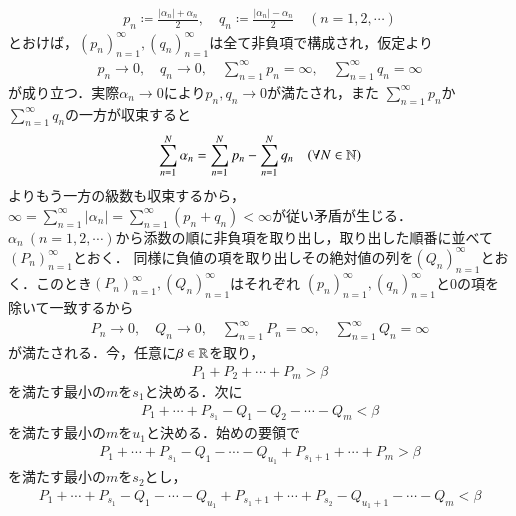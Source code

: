 	\begin{prf}
		\begin{align}
			p_n \coloneqq \frac{|\alpha_n| + \alpha_n}{2},
			\quad q_n \coloneqq \frac{|\alpha_n| - \alpha_n}{2}
			\quad (n=1,2,\cdots)
		\end{align}
		とおけば，$(p_n)_{n=1}^{\infty},(q_n)_{n=1}^{\infty}$は全て非負項で構成され，仮定より
		\begin{align}
			p_n \longrightarrow 0,
			\quad q_n \longrightarrow 0,
			\quad \sum_{n=1}^{\infty} p_n = \infty,
			\quad \sum_{n=1}^{\infty} q_n = \infty
		\end{align}
		が成り立つ．実際$\alpha_n \longrightarrow 0$により$p_n,q_n \longrightarrow 0$が満たされ，また
		$\sum_{n=1}^{\infty} p_n$か$\sum_{n=1}^{\infty} q_n$の一方が収束すると
		\begin{align}
			\sum_{n=1}^N \alpha_n = \sum_{n=1}^N p_n - \sum_{n=1}^N q_n
			\quad (\forall N \in \mathbb{N})
		\end{align}
		よりもう一方の級数も収束するから，
		$\infty = \sum_{n=1}^{\infty} |\alpha_n| = \sum_{n=1}^{\infty} (p_n + q_n) < \infty$が従い矛盾が生じる．
		$\alpha_n\ (n=1,2,\cdots)$から添数の順に非負項を取り出し，取り出した順番に並べて$(P_n)_{n=1}^{\infty}$とおく．
		同様に負値の項を取り出しその絶対値の列を$(Q_n)_{n=1}^{\infty}$とおく．このとき$(P_n)_{n=1}^{\infty},(Q_n)_{n=1}^{\infty}$はそれぞれ
		$(p_n)_{n=1}^{\infty},(q_n)_{n=1}^{\infty}$と0の項を除いて一致するから
		\begin{align}
			P_n \longrightarrow 0,
			\quad Q_n \longrightarrow 0,
			\quad \sum_{n=1}^{\infty} P_n = \infty,
			\quad \sum_{n=1}^{\infty} Q_n = \infty
			\label{eq:thm_riemann_series_1}
		\end{align}
		が満たされる．今，任意に$\beta \in \mathbb{R}$を取り，
		\begin{align}
			P_1 + P_2 + \cdots + P_m > \beta
		\end{align}
		を満たす最小の$m$を$s_1$と決める．次に
		\begin{align}
			P_1 + \cdots + P_{s_1} - Q_1 - Q_2 - \cdots - Q_m < \beta
		\end{align}
		を満たす最小の$m$を$u_1$と決める．始めの要領で
		\begin{align}
			P_1 + \cdots + P_{s_1} - Q_1 - \cdots - Q_{u_1}
			+ P_{s_1 + 1} + \cdots + P_m > \beta
		\end{align}
		を満たす最小の$m$を$s_2$とし，
		\begin{align}
			P_1 + \cdots + P_{s_1} - Q_1 - \cdots - Q_{u_1}
			+ P_{s_1 + 1} + \cdots + P_{s_2} - Q_{u_1 + 1} - \cdots - Q_m < \beta

\end{align}
\end{prf}

